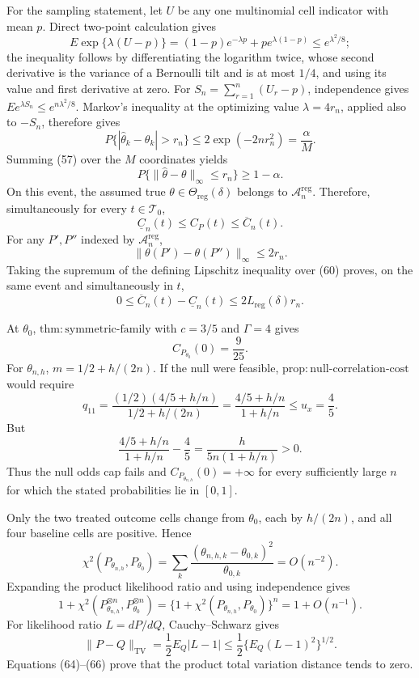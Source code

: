 For the sampling statement, let \(U\) be any one multinomial cell indicator with mean \(p\). Direct two-point calculation gives
\[
E\exp\{\lambda(U-p)\}=(1-p)e^{-\lambda p}+pe^{\lambda(1-p)}
\leq e^{\lambda^2/8};
\]
the inequality follows by differentiating the logarithm twice, whose second derivative is the variance of a Bernoulli tilt and is at most \(1/4\), and using its value and first derivative at zero. For \(S_n=\sum_{r=1}^n(U_r-p)\), independence gives \(E e^{\lambda S_n}\leq e^{n\lambda^2/8}\). Markov's inequality at the optimizing value \(\lambda=4r_n\), applied also to \(-S_n\), therefore gives
\[
P\{|\widehat\theta_k-\theta_k|>r_n\}
\leq2\exp(-2nr_n^2)=\frac{\alpha}{M}. \tag{57}
\]
Summing (57) over the \(M\) coordinates yields
\[
P\{\|\widehat\theta-\theta\|_\infty\leq r_n\}\geq1-\alpha. \tag{58}
\]
On this event, the assumed true \(\theta\in\Theta_{\mathrm{reg}}(\delta)\) belongs to \(\mathcal A_n^{\mathrm{reg}}\). Therefore, simultaneously for every \(t\in\mathcal T_0\),
\[
\underline C_n(t)\leq C_P(t)\leq\overline C_n(t). \tag{59}
\]
For any \(P',P''\) indexed by \(\mathcal A_n^{\mathrm{reg}}\),
\[
\|\theta(P')-\theta(P'')\|_\infty\leq2r_n. \tag{60}
\]
Taking the supremum of the defining Lipschitz inequality over (60) proves, on the same event and simultaneously in \(t\),
\[
0\leq\overline C_n(t)-\underline C_n(t)
\leq2L_{\mathrm{reg}}(\delta)r_n.
\]

At \(\theta_0\), \(\mathrm{thm{:}symmetric\mbox{-}family}\) with \(c=3/5\) and \(\Gamma=4\) gives
\[
C_{P_{\theta_0}}(0)=\frac9{25}. \tag{61}
\]
For \(\theta_{n,h}\), \(m=1/2+h/(2n)\). If the null were feasible, \(\mathrm{prop{:}null\mbox{-}correlation\mbox{-}cost}\) would require
\[
q_{11}=\frac{(1/2)(4/5+h/n)}{1/2+h/(2n)}
=\frac{4/5+h/n}{1+h/n}\leq u_x=\frac45. \tag{62}
\]
But
\[
\frac{4/5+h/n}{1+h/n}-\frac45
=\frac{h}{5n(1+h/n)}>0. \tag{63}
\]
Thus the null odds cap fails and \(C_{P_{\theta_{n,h}}}(0)=+\infty\) for every sufficiently large \(n\) for which the stated probabilities lie in \([0,1]\).

Only the two treated outcome cells change from \(\theta_0\), each by \(h/(2n)\), and all four baseline cells are positive. Hence
\[
\chi^2(P_{\theta_{n,h}},P_{\theta_0})
=\sum_k\frac{(\theta_{n,h,k}-\theta_{0,k})^2}{\theta_{0,k}}
=O(n^{-2}). \tag{64}
\]
Expanding the product likelihood ratio and using independence gives
\[
1+\chi^2(P_{\theta_{n,h}}^{\otimes n},P_{\theta_0}^{\otimes n})
=\{1+\chi^2(P_{\theta_{n,h}},P_{\theta_0})\}^{n}
=1+O(n^{-1}). \tag{65}
\]
For likelihood ratio \(L=dP/dQ\), Cauchy--Schwarz gives
\[
\|P-Q\|_{\mathrm{TV}}
=\frac12E_Q|L-1|
\leq\frac12\{E_Q(L-1)^2\}^{1/2}. \tag{66}
\]
Equations (64)--(66) prove that the product total variation distance tends to zero.

